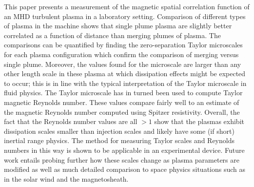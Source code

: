 \documentclass[aip,prl,amsmath,amssymb,reprint,superscriptaddress]{revtex4-1} %
\begin{document}
This paper presents a measurement of the magnetic spatial correlation function of an MHD turbulent plasma in a laboratory setting. Comparison of different types of plasma in the machine shows that single plume plasma are slightly better correlated as a function of distance than merging plumes of plasma. The comparisons can be quantified by finding the zero-separation Taylor microscales for each plasma configuration which confirm the comparison of merging versus single plume. Moreover, the values found for the microscale are larger than any other length scale in these plasma at which dissipation effects might be expected to occur; this is in line with the typical interpretation of the Taylor microscale in fluid physics. The Taylor microscale has in turned been used to compute Taylor magnetic Reynolds number. These values compare fairly well to an estimate of the magnetic Reynolds number computed using Spitzer resistivity. Overall, the fact that the Reynolds number values are all $> 1$ show that the plasmas exhibit dissipation scales smaller than injection scales and likely have some (if short) inertial range physics. The method for measuring Taylor scales and Reynolds numbers in this way is shown to be applicable in an experimental device. Future work entails probing further how these scales change as plasma parameters are modified as well as much detailed comparison to space physics situations such as in the solar wind and the magnetosheath.



\end{document}
